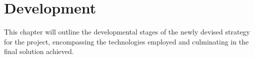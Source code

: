 \chapter{Development}
\label{ch:development}

This chapter will outline the developmental stages of the newly devised strategy for the project, encompassing the technologies employed and culminating in the final solution achieved.






